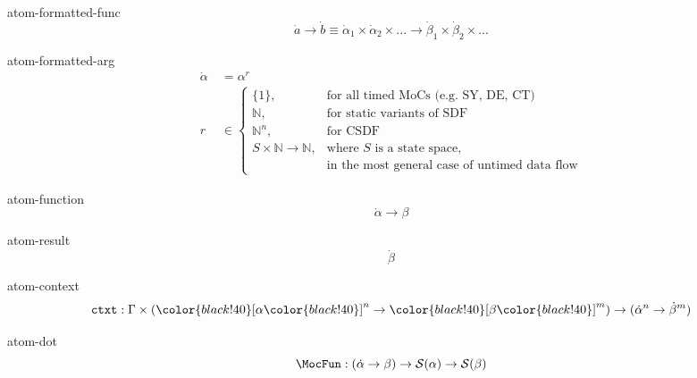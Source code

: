 \documentclass[preview]{standalone}
\begin{document}

\begin{docimage}{atom-formatted-func}
  \begin{equation*}%
    \dot{a} \rightarrow \dot{b}
    \equiv \dot{\alpha}_1 \times \dot{\alpha}_2 \times ...
    \rightarrow \dot{\beta}_1 \times \dot{\beta}_2 \times ...  
  \end{equation*}
\end{docimage} 

\begin{docimage}{atom-formatted-arg}
  \begin{align*}%
    \dot{\alpha}&\ = \alpha^r\\
    r&\ \in
    \begin{cases}
      \{1\}, & \text{for all timed MoCs (e.g. SY, DE, CT)} \\
      \mathbb{N}, & \text{for static variants of SDF}\\
      \mathbb{N}^n, & \text{for CSDF}\\
      S \times \mathbb{N} \rightarrow \mathbb{N}, & \text{where } S \text{ is a state space,} \\
        & \text{in the most general case of untimed data flow}
    \end{cases}
  \end{align*}
\end{docimage} 

\begin{docimage}{atom-function}
  \begin{equation*}%
    \dot{\alpha} \rightarrow \beta
  \end{equation*}
\end{docimage} 

\begin{docimage}{atom-result}
  \begin{equation*}%
    {\dot{\beta}}
  \end{equation*}
\end{docimage} 

\begin{docimage}{atom-context}
  \begin{equation*}%
    \mathtt{ctxt} : \Gamma \times ({\color{black!40}[}\alpha{\color{black!40}]}^n \rightarrow {\color{black!40}[}\beta{\color{black!40}]}^m )
    \rightarrow ({\dot{\alpha}^n \rightarrow \dot{\beta}^m})
  \end{equation*}
\end{docimage} 

\begin{docimage}{atom-dot}
  \begin{equation*}%
    \MocFun :
    ({\dot{\alpha} \rightarrow \beta})
    \rightarrow \mathcal{S}(\alpha) \rightarrow \mathcal{S}(\beta)
  \end{equation*}
\end{docimage} 
\end{document}
